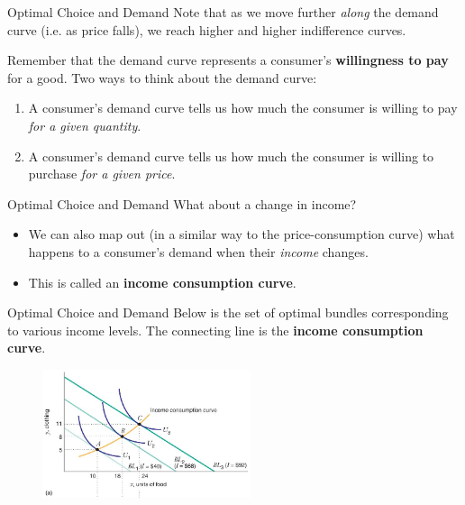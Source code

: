\documentclass[12pt,t]{beamer}
\begin{document}
\begin{frame}{Optimal Choice and Demand}
  Note that as we move further \textit{along} the demand curve (i.e. as price falls), we reach higher and higher indifference curves.


  \bigskip\pause
  Remember that the demand curve represents a consumer's \textbf{willingness to pay} for a good. Two ways to think about the demand curve:

  \bigskip
  \begin{enumerate}
    \item A consumer's demand curve tells us how much the consumer is willing to pay \emph{for a given quantity}.

    \item  A consumer's demand curve tells us how much the consumer is willing to purchase \emph{for a given price}.
  \end{enumerate}
\end{frame}

\begin{frame}{Optimal Choice and Demand}
  What about a change in income?
  \begin{itemize}
    \item We can also map out (in a similar way to the price-consumption curve) what happens to a consumer's demand when their \emph{income} changes.

    \item This is called an \textbf{income consumption curve}.
  \end{itemize}
\end{frame}

\begin{frame}{Optimal Choice and Demand}
Below is the set of optimal bundles corresponding to various income levels. The connecting line is the \textbf{income consumption curve}.
\begin{figure}
  \includegraphics[width=230px]{figures/fig5_2a.jpg}
\end{figure}
\end{frame}
\end{document}
